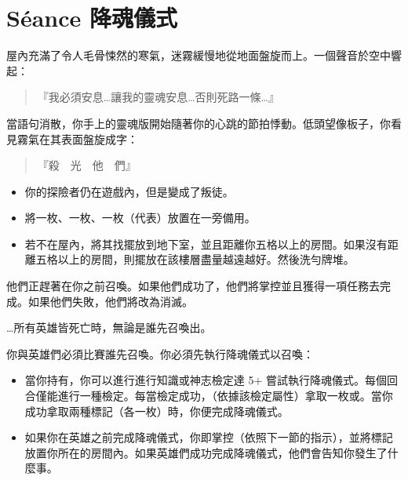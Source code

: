 
\chapter{Séance 降魂儀式}

\begin{HauntStory}
  屋內充滿了令人毛骨悚然的寒氣，迷霧緩慢地從地面盤旋而上。一個聲音於空中響起：

  \begin{quote}
    『我必須安息…讓我的靈魂安息…否則死路一條…』
  \end{quote}

  當語句消散，你手上的靈魂版開始隨著你的心跳的節拍悸動。低頭望像板子，你看見霧氣在其表面盤旋成字：

  \begin{quote}
    『殺　光　他　們』
  \end{quote}
\end{HauntStory}

\vspace*{-1em}
\begin{itemize}
  \item 你的探險者仍在遊戲內，但是變成了叛徒。
  \item 將一枚、一枚、一枚（代表）放置在一旁備用。
  \item 若不在屋內，將其找擺放到地下室，並且距離你五格以上的房間。如果沒有距離五格以上的房間，則擺放在該樓層盡量越遠越好。然後洗勻牌堆。
\end{itemize}

他們正趕著在你之前召喚。如果他們成功了，他們將掌控並且獲得一項任務去完成。如果他們失敗，他們將改為消滅。

…所有英雄皆死亡時，無論是誰先召喚出。

你與英雄們必須比賽誰先召喚。你必須先執行降魂儀式以召喚：
\begin{itemize}
  \item 當你持有，你可以進行進行知識或神志檢定達 5+ 嘗試執行降魂儀式。每個回合僅能進行一種檢定。每當檢定成功，（依據該檢定屬性）拿取一枚或。當你成功拿取兩種標記（各一枚）時，你便完成降魂儀式。
  \item 如果你在英雄之前完成降魂儀式，你即掌控（依照下一節的指示），並將標記放置你所在的房間內。如果英雄們成功完成降魂儀式，他們會告知你發生了什麼事。
\end{itemize}

